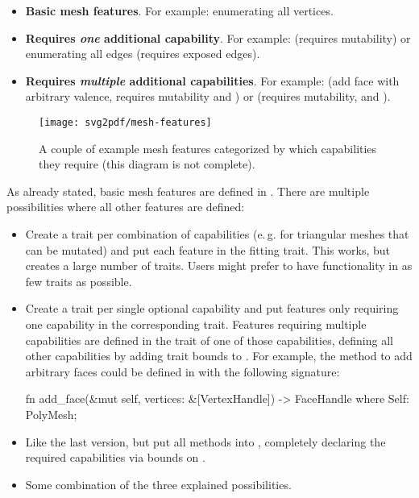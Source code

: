 \begin{itemize}
  \item \textbf{Basic mesh features}. For example: enumerating all vertices.
  \item \textbf{Requires \emph{one} additional capability}. For example:  (requires mutability) or enumerating all edges (requires exposed edges).
  \item \textbf{Requires \emph{multiple} additional capabilities}. For example:  (add face with arbitrary valence, requires mutability and ) or  (requires mutability,  and ). %
\end{itemize}

\begin{figure}[t]
  \centering
  \texttt{[image: svg2pdf/mesh-features]}
  \caption{
    A couple of example mesh features categorized by which capabilities they require (this diagram is not complete).
  }
  \label{fig:mesh-features}
\end{figure}

As already stated, basic mesh features are defined in .
There are multiple possibilities where all other features are defined:

\begin{itemize}
  \item Create a trait per combination of capabilities (e.\,g.  for triangular meshes that can be mutated) and put each feature in the fitting trait.
  This works, but creates a large number of traits.
  Users might prefer to have functionality in as few traits as possible.
  \item Create a trait per single optional capability and put features only requiring one capability in the corresponding trait.
  Features requiring multiple capabilities are defined in the trait of one of those capabilities, defining all other capabilities by adding trait bounds to .
  For example, the method to add arbitrary faces could be defined in  with the following signature:

  \begin{rustcode}
    fn add_face(&mut self, vertices: &[VertexHandle]) -> FaceHandle
    where
        Self: PolyMesh;
  \end{rustcode}

  \item Like the last version, but put all methods into , completely declaring the required capabilities via bounds on .
  \item Some combination of the three explained possibilities.
\end{itemize}

